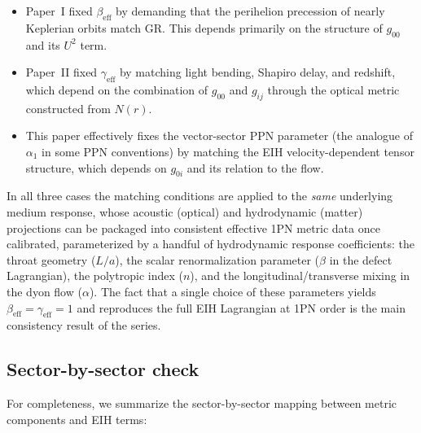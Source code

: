 \documentclass[11pt]{article}
\begin{document}
\begin{itemize}
  \item Paper~I fixed $\beta_{\text{eff}}$ by demanding that the
        perihelion precession of nearly Keplerian orbits match GR.
        This depends primarily on the structure of $g_{00}$ and its
        $U^2$ term.
  \item Paper~II fixed $\gamma_{\text{eff}}$ by matching light
        bending, Shapiro delay, and redshift, which depend on the
        combination of $g_{00}$ and $g_{ij}$ through the optical
        metric constructed from $N(r)$.
  \item This paper effectively fixes the vector-sector PPN parameter
        (the analogue of $\alpha_1$ in some PPN conventions) by
        matching the EIH velocity-dependent tensor structure, which
        depends on $g_{0i}$ and its relation to the flow.
\end{itemize}

In all three cases the matching conditions are applied to the
\emph{same} underlying medium response, whose acoustic (optical) and hydrodynamic
(matter) projections can be packaged into consistent effective 1PN
metric data once calibrated, parameterized by a handful of
hydrodynamic response coefficients: the throat geometry ($L/a$), the
scalar renormalization parameter ($\beta$ in the defect Lagrangian),
the polytropic index ($n$), and the longitudinal/transverse mixing in
the dyon flow ($\alpha$).
The fact that a single choice of these parameters yields
$\beta_{\text{eff}}=\gamma_{\text{eff}}=1$ and reproduces the full
EIH Lagrangian at 1PN order is the main consistency result of the
series.

\subsection{Sector-by-sector check}

For completeness, we summarize the sector-by-sector mapping between
metric components and EIH terms:
\end{document}
